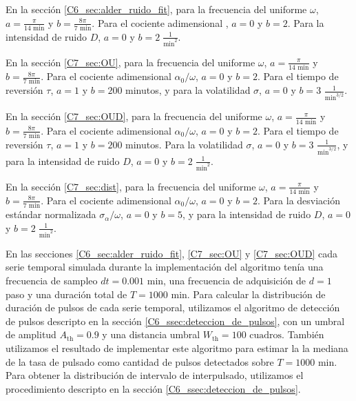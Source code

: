 \documentclass[./main.tex]{subfiles}
\begin{document}
\begin{subappendices}
En la sección \ref{C6_sec:alder_ruido_fit}, para la frecuencia del uniforme $\omega$, $a = \frac{\pi}{14 \text{ min}}$ y $b = \frac{8\pi}{7 \text{ min}}$. Para el cociente adimensional \ddelta, $a = 0$ y $b = 2$. Para la intensidad de ruido $D$, $a = 0$ y $b = 2 \; \frac{1}{\text{min}^2}$. 


En la sección \ref{C7_sec:OU}, para la frecuencia del uniforme $\omega$, $a = \frac{\pi}{14 \text{ min}}$ y $b = \frac{8\pi}{7 \text{ min}}$. Para el cociente adimensional $\alpha_0/\omega$, $a = 0$ y $b = 2$. Para el tiempo de reversión $\tau$, $a = 1$ y $b = 200$ minutos, y para la volatilidad $\sigma$, $a = 0$ y $b = 3$ $\frac{1}{\text{min}^{3/2}}$. 

En la sección \ref{C7_sec:OUD}, para la frecuencia del uniforme $\omega$, $a = \frac{\pi}{14 \text{ min}}$ y $b = \frac{8\pi}{7 \text{ min}}$. Para el cociente adimensional $\alpha_0/\omega$, $a = 0$ y $b = 2$. Para el tiempo de reversión $\tau$, $a = 1$ y $b = 200$ minutos. Para la volatilidad $\sigma$, $a = 0$ y $b = 3$ $\frac{1}{\text{min}^{3/2}}$, y para la intensidad de ruido $D$, $a = 0$ y $b = 2\;\frac{1}{\text{min}^2}$.

En la sección \ref{C7_sec:dist}, para la frecuencia del uniforme $\omega$, $a = \frac{\pi}{14 \text{ min}}$ y $b = \frac{8\pi}{7 \text{ min}}$. Para el cociente adimensional $\alpha_0/\omega$, $a = 0$ y $b = 2$. Para la desviación estándar normalizada $\sigma_{\alpha}/\omega$, $a = 0$ y $b = 5$, y para la intensidad de ruido $D$, $a = 0$ y $b = 2\;\frac{1}{\text{min}^2}$.



En las secciones \ref{C6_sec:alder_ruido_fit}, \ref{C7_sec:OU} y \ref{C7_sec:OUD} cada serie temporal simulada durante la implementación del algoritmo tenía una frecuencia de sampleo $dt = 0.001 \text{ min}$, una frecuencia de adquisición de $d = 1$ paso y una duración total de $T = 1000 \text{ min}$. Para calcular la distribución de duración de pulsos de cada serie temporal, utilizamos el algoritmo de detección de pulsos descripto en la sección \ref{C6_ssec:deteccion_de_pulsos}, con un umbral de amplitud $A_{\text{th}} = 0.9$ y una distancia umbral $W_{\text{th}} = 100 \text{ cuadros}$. También utilizamos el resultado de implementar este algoritmo para estimar la la mediana de la tasa de pulsado como cantidad de pulsos detectados sobre $T = 1000 \text{ min}$. Para obtener la distribución de intervalo de interpulsado, utilizamos el procedimiento descripto en la sección \ref{C6_ssec:deteccion_de_pulsos}.  



\end{subappendices}
\end{document}
